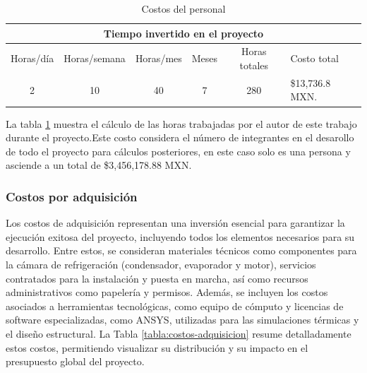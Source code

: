   
 \begin{table}[H]
 	\centering
 	\caption{ Costos del personal}
 	\label{tabla:costopersonal}
\begin{tabular}{@{}cccccl@{}}
	\toprule
	\multicolumn{6}{c}{Tiempo invertido en el proyecto}                                \\ \midrule
	Horas/día & Horas/semana & Horas/mes & Meses & Horas totales & Costo total         \\ \midrule
	2         & 10           & 40        & 7     & 280           & \$13,736.8 MXN. \\ \bottomrule
\end{tabular}
 \end{table}
  
  
  La tabla \ref{tabla:costopersonal} muestra el cálculo de las horas trabajadas por el autor de este trabajo durante el proyecto.Este costo considera el número de integrantes en el desarollo de todo el proyecto para cálculos posteriores, en este caso solo es una persona y asciende a un total de \$3,456,178.88 MXN.
  
  \subsubsection{Costos por adquisición}
  Los costos de adquisición representan una inversión esencial para garantizar la ejecución exitosa del proyecto, incluyendo todos los elementos necesarios para su desarrollo. Entre estos, se consideran materiales técnicos como componentes para la cámara de refrigeración (condensador, evaporador y motor), servicios contratados para la instalación y puesta en marcha, así como recursos administrativos como papelería y permisos. Además, se incluyen los costos asociados a herramientas tecnológicas, como equipo de cómputo y licencias de software especializadas, como ANSYS, utilizadas para las simulaciones térmicas y el diseño estructural. La Tabla \ref{tabla:costos-adquisicion} resume detalladamente estos costos, permitiendo visualizar su distribución y su impacto en el presupuesto global del proyecto.
  
